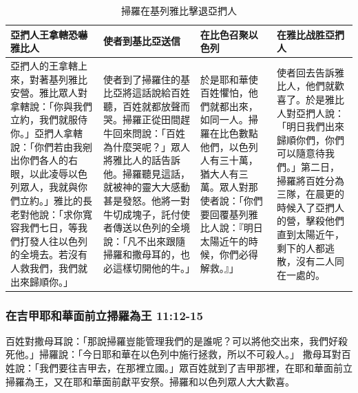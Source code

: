 \begin{table}[H]
\centering 
\begin{tabular}{p{}|p{4.8cm}|p{3.1cm}|p{3.8cm}}
\hline
\hline
亞捫人王拿轄恐嚇雅比人&使者到基比亞送信&在比色召聚以色列&在雅比战胜亞捫人\\\hline\hline
亞捫人的王拿轄上來，對著基列雅比安營。雅比眾人對拿轄說：「你與我們立約，我們就服侍你。」亞捫人拿轄說：「你們若由我剜出你們各人的右眼，以此凌辱以色列眾人，我就與你們立約。」雅比的長老對他說：「求你寬容我們七日，等我們打發人往以色列的全境去。若沒有人救我們，我們就出來歸順你。」 
&使者到了掃羅住的基比亞將這話說給百姓聽，百姓就都放聲而哭。掃羅正從田間趕牛回來問說：「百姓為什麼哭呢？」眾人將雅比人的話告訴他。掃羅聽見這話，就被神的靈大大感動甚是發怒。他將一對牛切成塊子，託付使者傳送以色列的全境說：「凡不出來跟隨掃羅和撒母耳的，也必這樣切開他的牛。」
&於是耶和華使百姓懼怕，他們就都出來，如同一人。掃羅在比色數點他們，以色列人有三十萬，猶大人有三萬。眾人對那使者說：「你們要回覆基列雅比人說：『明日太陽近午的時候，你們必得解救。』」 
&使者回去告訴雅比人，他們就歡喜了。於是雅比人對亞捫人說：「明日我們出來歸順你們，你們可以隨意待我們。」第二日，掃羅將百姓分為三隊，在晨更的時候入了亞捫人的營，擊殺他們直到太陽近午，剩下的人都逃散，沒有二人同在一處的。
\\\hline 
\end{tabular}
\caption{掃羅在基列雅比擊退亞捫人}
\end{table}


\subsubsection{在吉甲耶和華面前立掃羅為王 11:12-15}
百姓對撒母耳說：「那說掃羅豈能管理我們的是誰呢？可以將他交出來，我們好殺死他。」掃羅說：「今日耶和華在以色列中施行拯救，所以不可殺人。」
撒母耳對百姓說：「我們要往吉甲去，在那裡立國。」眾百姓就到了吉甲那裡，在耶和華面前立掃羅為王，又在耶和華面前獻平安祭。掃羅和以色列眾人大大歡喜。



